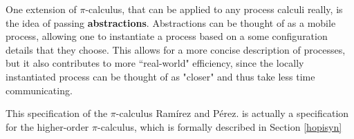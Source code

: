 One extension of $\pi$-calculus, that can be applied to any process calculi really, is the idea of passing \textbf{abstractions}. Abstractions can be thought of as a mobile process, allowing one to instantiate a process based on a some configuration details that they choose. This allows for a more concise description of processes, but it also contributes to more ``real-world" efficiency, since the locally instantiated process can be thought of as "closer" and thus take less time communicating.

This specification of the $\pi$-calculus Ramírez and Pérez. \cite{main} is actually a specification for the higher-order $\pi$-calculus, which is formally described in Section \ref{hopisyn}

